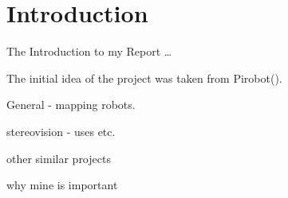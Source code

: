 \chapter{Introduction} \label{Chapter:Introduction}
The Introduction to my Report \dots

The initial idea of the project was taken from Pirobot(\cite{Pirobot}).

General - mapping robots. 

stereovision - uses etc.

other similar projects

why mine is important 
